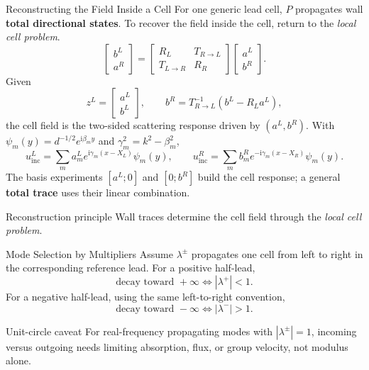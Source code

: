 \documentclass[aspectratio=169]{beamer}
\newcommand{\ii}{\mathrm{i}}
\begin{document}
\begin{frame}{Reconstructing the Field Inside a Cell}
  \footnotesize
  For one generic lead cell, \(P\) propagates wall \textbf{total directional
  states}.  To recover the field inside the cell, return to the
  \emph{local cell problem}.
  \[
    \begin{bmatrix}b^L\\a^R\end{bmatrix}
    =
    \begin{bmatrix}R_L&T_{R\to L}\\T_{L\to R}&R_R\end{bmatrix}
    \begin{bmatrix}a^L\\b^R\end{bmatrix}.
  \]
  Given
  \[
    z^L=\begin{bmatrix}a^L\\b^L\end{bmatrix},
    \qquad
    b^R=T_{R\to L}^{-1}(b^L-R_La^L),
  \]
  the cell field is the two-sided scattering response driven by
  \((a^L,b^R)\).  With
  \(\psi_m(y)=d^{-1/2}e^{\ii\beta_m y}\) and
  \(\gamma_m^2=k^2-\beta_m^2\),
  \[
    u_{\mathrm{inc}}^L
    =
    \sum_m a_m^L e^{\ii\gamma_m(x-X_L)}\psi_m(y),
    \qquad
    u_{\mathrm{inc}}^R
    =
    \sum_m b_m^R e^{-\ii\gamma_m(x-X_R)}\psi_m(y).
  \]
  The basis experiments \([a^L;0]\) and \([0;b^R]\) build the cell response;
  a general \textbf{total trace} uses their linear combination.
  \begin{block}{Reconstruction principle}
    Wall traces determine the cell field through the \emph{local cell problem}.
  \end{block}
\end{frame}


\begin{frame}{Mode Selection by Multipliers}
  Assume \(\lambda^\pm\) propagates one cell from left to right in the
  corresponding reference lead.
  For a positive half-lead,
  \[
    \boxed{
    \text{decay toward }+\infty
    \iff
    |\lambda^+|<1.
    }
  \]
  For a negative half-lead, using the same left-to-right convention,
  \[
    \boxed{
    \text{decay toward }-\infty
    \iff
    |\lambda^-|>1.
    }
  \]
  \begin{alertblock}{Unit-circle caveat}
    For real-frequency propagating modes with \(|\lambda^\pm|=1\), incoming versus
    outgoing needs limiting absorption, flux, or group velocity, not modulus
    alone.
  \end{alertblock}
\end{frame}
\end{document}
